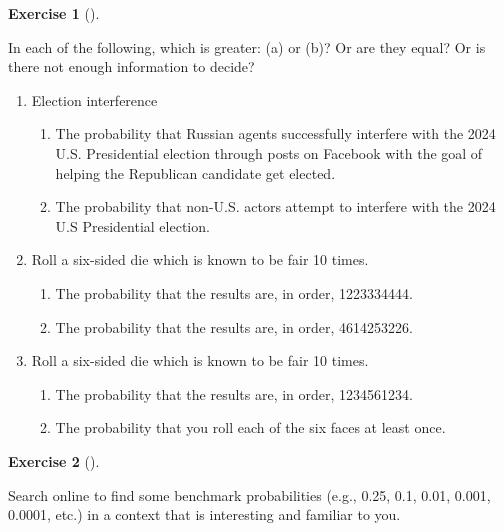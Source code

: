 \documentclass[
  letterpaper,
  DIV=11,
  numbers=noendperiod]{scrreprt}
\providecommand{\tightlist}{%
  \setlength{\itemsep}{0pt}\setlength{\parskip}{0pt}}
\theoremstyle{plain}
\theoremstyle{definition}
\theoremstyle{definition}
\newtheorem{exercise}{Exercise}[chapter]
\theoremstyle{definition}
\theoremstyle{remark}
\begin{document}
\begin{exercise}[]\protect\hypertarget{exr-greater-particular-vs-general}{}\label{exr-greater-particular-vs-general}

In each of the following, which is greater: (a) or (b)? Or are they
equal? Or is there not enough information to decide?

\begin{enumerate}
\def\labelenumi{\arabic{enumi}.}
\tightlist
\item
  Election interference

  \begin{enumerate}
  \def\labelenumii{\alph{enumii}.}
  \tightlist
  \item
    The probability that Russian agents successfully interfere with the
    2024 U.S. Presidential election through posts on Facebook with the
    goal of helping the Republican candidate get elected.
  \item
    The probability that non-U.S. actors attempt to interfere with the
    2024 U.S Presidential election.
  \end{enumerate}
\item
  Roll a six-sided die which is known to be fair 10 times.

  \begin{enumerate}
  \def\labelenumii{\alph{enumii}.}
  \tightlist
  \item
    The probability that the results are, in order, 1223334444.
  \item
    The probability that the results are, in order, 4614253226.
  \end{enumerate}
\item
  Roll a six-sided die which is known to be fair 10 times.

  \begin{enumerate}
  \def\labelenumii{\alph{enumii}.}
  \tightlist
  \item
    The probability that the results are, in order, 1234561234.
  \item
    The probability that you roll each of the six faces at least once.
  \end{enumerate}
\end{enumerate}

\end{exercise}

\begin{exercise}[]\protect\hypertarget{exr-benchmarks}{}\label{exr-benchmarks}

Search online to find some benchmark probabilities (e.g., 0.25, 0.1,
0.01, 0.001, 0.0001, etc.) in a context that is interesting and familiar
to you.

\end{exercise}
\end{document}
